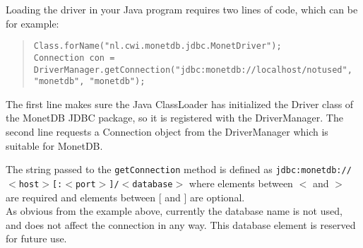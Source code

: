 \documentclass{article}
\begin{document}
Loading the driver in your Java program requires two lines of code, which can be for example:
\begin{quote}
\texttt{Class.forName("nl.cwi.monetdb.jdbc.MonetDriver");\\
Connection con = DriverManager.getConnection("jdbc:monetdb://localhost/notused", "monetdb", "monetdb");}
\end{quote}
The first line makes sure the Java ClassLoader has initialized the Driver class of the MonetDB
JDBC package, so it is registered with the DriverManager. The second line requests a Connection
object from the DriverManager which is suitable for MonetDB.

The string passed to the \texttt{getConnection} method is defined as
\texttt{jdbc:monetdb://$<$host$>$[:$<$port$>$]/$<$database$>$} where elements between
$<$ and $>$ are required and elements between [ and ] are optional.\\
As obvious from the example above, currently the database name is not used, and does not affect
the connection in any way. This database element is reserved for future use.
\end{document}
